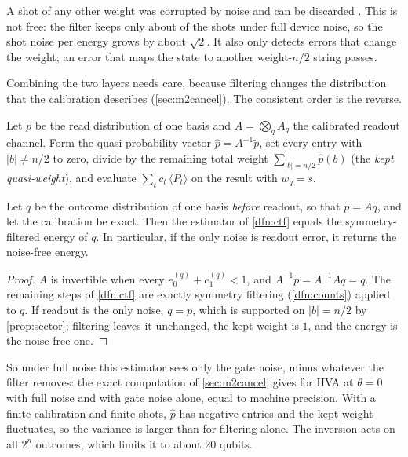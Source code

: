 A shot of any other weight was corrupted by noise and can be discarded \parencite{bonetmonroig2018,mcardle2019}.
This is not free: the filter keeps only about \VMtKept{} of the shots under full device noise,
so the shot noise per energy grows by about $\sqrt2$. It also only detects errors that change
the weight; an error that maps the state to another weight-$n/2$ string passes.

Combining the two layers needs care, because filtering changes the distribution that the
calibration describes (\cref{sec:m2cancel}). The consistent order is the reverse.

\begin{dfn}\label{dfn:ctf}
  Let $\tilde p$ be the read distribution of one basis and $A=\bigotimes_q A_q$ the calibrated
  readout channel. Form the quasi-probability vector $\hat p=A^{-1}\tilde p$, set every entry with
  $|b|\ne n/2$ to zero, divide by the remaining total weight $\sum_{|b|=n/2}\hat p(b)$ (the
  \emph{kept quasi-weight}), and evaluate $\sum_t c_t\,\langle P_t\rangle$ on the result with
  $w_q=s$.
\end{dfn}

\begin{prop}\label{prop:ctf}
  Let $q$ be the outcome distribution of one basis \emph{before} readout, so that
  $\tilde p=Aq$, and let the calibration be exact. Then the estimator of \cref{dfn:ctf} equals
  the symmetry-filtered energy of $q$. In particular, if the only noise is readout error, it
  returns the noise-free energy.
\end{prop}

\begin{proof}
  $A$ is invertible when every $e_0^{(q)}+e_1^{(q)}<1$, and $A^{-1}\tilde p=A^{-1}Aq=q$. The
  remaining steps of \cref{dfn:ctf} are exactly symmetry filtering (\cref{dfn:counts}) applied
  to $q$. If readout is the only noise, $q=p$, which is supported on $|b|=n/2$ by
  \cref{prop:sector}; filtering leaves it unchanged, the kept weight is $1$, and the energy is
  the noise-free one.
\end{proof}

So under full noise this estimator sees only the gate noise, minus whatever the filter removes:
the exact computation of \cref{sec:m2cancel} gives \VMxHvaZeroFullCtf{} for HVA at $\theta=0$
with full noise and \VMxHvaZeroGtCtf{} with gate noise alone, equal to machine precision. With a finite calibration and finite shots,
$\hat p$ has negative entries and the kept weight fluctuates, so the variance is larger than
for filtering alone. The inversion acts on all $2^n$ outcomes, which limits it to about 20
qubits.

